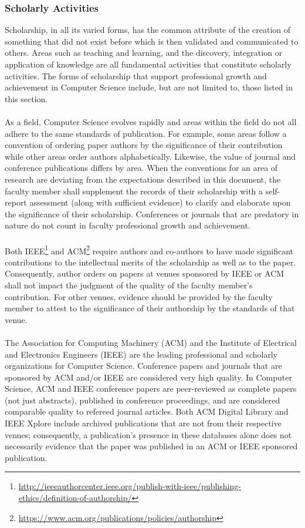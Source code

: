 \documentclass{article}
\begin{document}
\subsubsection{Scholarly Activities}

Scholarship, in all its varied forms, has the common attribute of the creation of something that did not exist before which is then validated and communicated to others. Areas such as teaching and learning, and the discovery, integration or application of knowledge are all fundamental activities that constitute scholarly activities. The forms of scholarship that support professional growth and achievement in Computer Science include, but are not limited to, those listed in this section.
\\\\
As a field, Computer Science evolves rapidly and areas within the field do not all adhere to the same standards of publication. For example, some areas follow a convention of ordering paper authors by the significance of their contribution while other areas order authors alphabetically. Likewise, the value of journal and conference publications differs by area. When the conventions for an area of research are deviating from the expectations described in this document, the faculty member shall supplement the records of their scholarship with a self-report assessment (along with sufficient evidence) to clarify and elaborate upon the significance of their scholarship.
Conferences or journals that are predatory in nature do not count in faculty professional growth and achievement.
\\\\
Both IEEE\footnote{\href{http://ieeeauthorcenter.ieee.org/publish-with-ieee/publishing-ethics/definition-of-authorship/}{http://ieeeauthorcenter.ieee.org/publish-with-ieee/publishing-ethics/definition-of-authorship/}} and ACM\footnote{\href{https://www.acm.org/publications/policies/authorship}{https://www.acm.org/publications/policies/authorship}} require authors and co-authors to have made significant contributions to the intellectual merits of the scholarship as well as to the paper. Consequently, author orders on papers at venues sponsored by IEEE or ACM shall not impact the judgment of the quality of the faculty member’s contribution. For other venues, evidence should be provided by the faculty member to attest to the significance of their authorship by the standards of that venue.
\\\\
The Association for Computing Machinery (ACM) and the Institute of Electrical and Electronics Engineers (IEEE) are the leading professional and scholarly organizations for Computer Science. Conference papers and journals that are sponsored by ACM and/or IEEE are considered very high quality. In Computer Science, ACM and IEEE conference papers are peer-reviewed as complete papers (not just abstracts), published in conference proceedings, and are considered comparable quality to refereed journal articles. Both ACM Digital Library and IEEE Xplore include archived publications that are not from their respective venues; consequently, a publication’s presence in these databases alone does not necessarily evidence that the paper was published in an ACM or IEEE sponsored publication.
\end{document}
